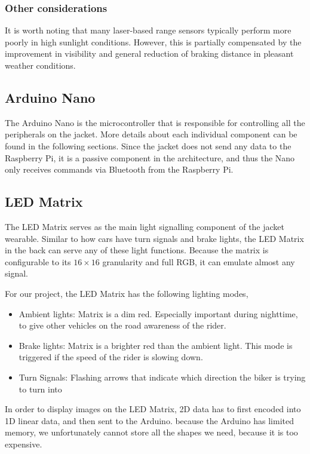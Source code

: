 \documentclass[journal]{IEEEtran}
\begin{document}
\subsubsection{Other considerations}
It is worth noting that many laser-based range sensors typically perform more poorly in high sunlight conditions. However, this is partially compensated by the improvement in visibility and general reduction of braking distance in pleasant weather conditions.

\subsection{Arduino Nano}
The Arduino Nano is the microcontroller that is responsible for controlling all the peripherals on the jacket. More details about each individual component can be found in the following sections. Since the jacket does not send any data to the Raspberry Pi, it is a passive component in the architecture, and thus the Nano only receives commands via Bluetooth from the Raspberry Pi. 

\subsection{LED Matrix}
The LED Matrix serves as the main light signalling component of the jacket wearable. Similar to how cars have turn signals and brake lights, the LED Matrix in the back can serve any of these light functions. Because the matrix is configurable to its $16 \times 16$ granularity and full RGB, it can emulate almost any signal. 

For our project, the LED Matrix has the following lighting modes,
\begin{itemize}
    \item Ambient lights: Matrix is a dim red. Especially important during nighttime, to give other vehicles on the road awareness of the rider.
    \item Brake lights: Matrix is a brighter red than the ambient light. This mode is triggered if the speed of the rider is slowing down. 
    \item Turn Signals: Flashing arrows that indicate which direction the biker is trying to turn into
\end{itemize}

In order to display images on the LED Matrix, 2D data has to first encoded into 1D linear data, and then sent to the Arduino. because the Arduino has limited memory, we unfortunately cannot store all the shapes we need, because it is too expensive.
\end{document}
